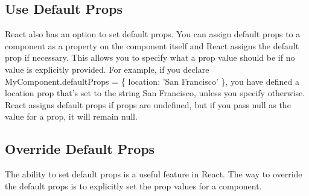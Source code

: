 \documentclass{article}%
\begin{document}
%
\subsection{Use Default Props}%
\label{subsec:UseDefaultProps}%
React also has an option to set default props. You can assign default props to a component as a property on the component itself and React assigns the default prop if necessary. This allows you to specify what a prop value should be if no value is explicitly provided. For example, if you declare MyComponent.defaultProps = \{ location: 'San Francisco' \}, you have defined a location prop that's set to the string San Francisco, unless you specify otherwise. React assigns default props if props are undefined, but if you pass null as the value for a prop, it will remain null.\newline%

%
\subsection{Override Default Props}%
\label{subsec:OverrideDefaultProps}%
The ability to set default props is a useful feature in React. The way to override the default props is to explicitly set the prop values for a component.\newline%

%
\end{document}
